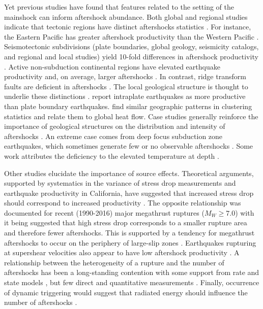 \documentclass[draft, jgrga]{agujournal2018}
\begin{document}
Yet previous studies have found that features related to the setting of the mainshock can inform aftershock abundance. Both global and regional studies indicate that tectonic regions have distinct aftershocks statistics \citep{Chu2011, Page, Davidsen2015GeneralizedCalifornia, Tahir2014Aftershock2005, ogata2017statistics}. For instance, the Eastern Pacific has greater aftershock productivity than the Western Pacific \citep{Singh1911, Wetzler2016}. Seismotectonic subdivisions (plate boundaries, global geology, seismicity catalogs, and regional and local studies) yield 10-fold differences in aftershock productivity \citep{Page}. Active non-subduction continental regions have elevated earthquake productivity and, on average, larger aftershocks \citep{Page, Mogi1967, Davis1991Single-linkVariations}. In contrast, ridge transform faults are deficient in aftershocks \citep{Davis1991Single-linkVariations, Boettcher2004EarthquakeFaults, McGuire2005}. The local geological structure is thought to underlie these distinctions \citep{Boettcher2004EarthquakeFaults, McCloskey2003StructuralAftershocks}. \citet{Yamanaka1990scalingshock} report intraplate earthquakes as more productive than plate boundary earthquakes. \citet{Zaliapin2016AClusters} find similar geographic patterns in clustering statistics and relate them to global heat flow. Case studies generally reinforce the importance of geological structures on the distribution and intensity of aftershocks \citep{Das2003SpatialDistribution, McCloskey2003StructuralAftershocks}. An extreme case comes from deep focus subduction zone earthquakes, which sometimes generate few or no observable aftershocks \citep{Bath1965LateralMantle, Frohlich1989TheEarthquakes, Nyffenegger2000, Wiens1997AftershockZone, Wu1999, Houston2004}. Some work attributes the deficiency to the elevated temperature at depth \citep{Nyffenegger2000, Houston2004}.

Other studies elucidate the importance of source effects. Theoretical arguments, supported by systematics in the variance of stress drop measurements and earthquake productivity in California, have suggested that increased stress drop should correspond to increased productivity \citep{Marsan2017HowAftershocks}. The opposite relationship was documented for recent (1990-2016) major megathrust ruptures ($M_W \ge 7.0$) \citep{Wetzler2016} with it being suggested that high stress drop corresponds to a smaller rupture area and therefore fewer aftershocks. This is supported by a tendency for megathrust aftershocks to occur on the periphery of large-slip zones \citep{Wetzler2016}. Earthquakes rupturing at supershear velocities also appear to have low aftershock productivity \citep{Bouchon2008TheEarthquakes}. A relationship between the heterogeneity of a rupture and the number of aftershocks has been a long-standing contention \citep{Mogi1967, Yamanaka1990scalingshock} with some support from rate and state models \citep{Helmstetter2006RelationModel, Marsan2006}, but few direct and quantitative measurements \citep{Das2003SpatialDistribution, Houston2004}. Finally, occurrence of dynamic triggering would suggest that radiated energy should influence the number of aftershocks \citep{felzer2006decay}.
\end{document}
